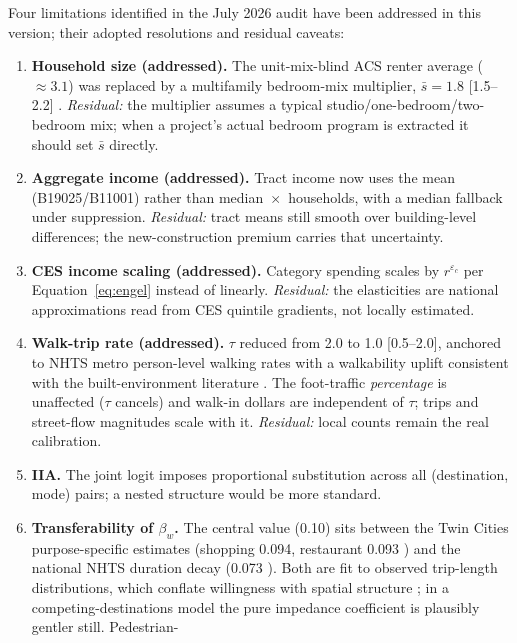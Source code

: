 \documentclass[11pt]{article}
\begin{document}
Four limitations identified in the July 2026 audit have been addressed in this
version; their adopted resolutions and residual caveats:
\begin{enumerate}
\item \textbf{Household size (addressed).} The unit-mix-blind ACS renter
      average ($\approx 3.1$) was replaced by a multifamily bedroom-mix
      multiplier, $\bar{s} = 1.8$ [1.5--2.2] \cite{listokin2006}.
      \emph{Residual:} the multiplier assumes a typical
      studio/one-bedroom/two-bedroom mix;
      when a project's actual bedroom program is extracted it should set
      $\bar{s}$ directly.
\item \textbf{Aggregate income (addressed).} Tract income now uses the mean
      (B19025/B11001) rather than median~$\times$~households, with a median
      fallback under suppression. \emph{Residual:} tract means still smooth
      over building-level differences; the new-construction premium carries
      that uncertainty.
\item \textbf{CES income scaling (addressed).} Category spending scales by
      $r^{\varepsilon_c}$ per Equation~\eqref{eq:engel} instead of linearly.
      \emph{Residual:} the elasticities are national approximations read from
      CES quintile gradients, not locally estimated.
\item \textbf{Walk-trip rate (addressed).} $\tau$ reduced from 2.0 to 1.0
      [0.5--2.0], anchored to NHTS metro person-level walking rates with a
      walkability uplift consistent with the built-environment literature
      \cite{nhts, ewing2010}. The foot-traffic \emph{percentage} is unaffected
      ($\tau$ cancels) and walk-in dollars are independent of $\tau$; trips and
      street-flow magnitudes scale with it. \emph{Residual:} local counts
      remain the real calibration.
\item \textbf{IIA.} The joint logit imposes proportional substitution across all
      (destination, mode) pairs; a nested structure would be more standard.
\item \textbf{Transferability of $\beta_w$.} The central value (0.10) sits
      between the Twin Cities purpose-specific estimates (shopping 0.094,
      restaurant 0.093 \cite{iacono2008}) and the national NHTS duration
      decay (0.073 \cite{yang2012}). Both are fit to observed trip-length
      distributions, which conflate willingness with spatial structure
      \cite{sheppard1995}; in a competing-destinations model
      the pure impedance coefficient is plausibly gentler still. Pedestrian-

\end{enumerate}
\end{document}
